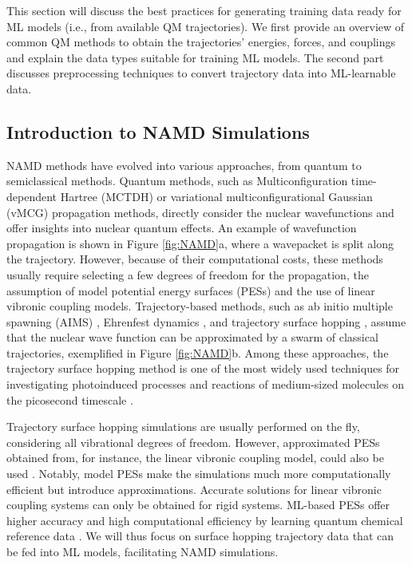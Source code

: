\documentclass[9pt,bestpractices]{livecoms}
\begin{document}
This section will discuss the best practices for generating training data ready for ML models (i.e., from available QM trajectories). We first provide an overview of common QM methods to obtain the trajectories' energies, forces, and couplings and explain the data types suitable for training ML models. The second part discusses preprocessing techniques to convert trajectory data into ML-learnable data.

\subsection{Introduction to NAMD Simulations}

NAMD methods have evolved into various approaches, from quantum to semiclassical methods. Quantum methods, such as Multiconfiguration time-dependent Hartree  (MCTDH) \cite{RN87} or variational multiconfigurational Gaussian (vMCG) \cite{RN88} propagation methods, directly consider the nuclear wavefunctions and offer insights into nuclear quantum effects. An example of wavefunction propagation is shown in Figure \ref{fig:NAMD}a, where a wavepacket is split along the trajectory. However, because of their computational costs, these methods usually require selecting a few degrees of freedom for the propagation, the assumption of model potential energy surfaces (PESs) and the use of linear vibronic coupling models. Trajectory-based methods, such as ab initio multiple spawning (AIMS) \cite{RN118, RN85, RN86}, Ehrenfest dynamics \cite{RN141, RN154}, and trajectory surface hopping \cite{RN154, RN133, RN134}, assume that the nuclear wave function can be approximated by a swarm of classical trajectories, exemplified in Figure \ref{fig:NAMD}b. Among these approaches, the trajectory surface hopping method is one of the most widely used techniques for investigating photoinduced processes and reactions of medium-sized molecules on the picosecond timescale \cite{RN118}.

Trajectory surface hopping simulations are usually performed on the fly, considering all vibrational degrees of freedom. However, approximated PESs obtained from, for instance, the linear vibronic coupling model, could also be used \cite{RN3}. Notably, model PESs make the simulations much more computationally efficient but introduce approximations. Accurate solutions for linear vibronic coupling systems can only be obtained for rigid systems. ML-based PESs offer higher accuracy and high computational efficiency by learning quantum chemical reference data \cite{RN98, RN139}. We will thus focus on surface hopping trajectory data that can be fed into ML models, facilitating NAMD simulations.
\end{document}

